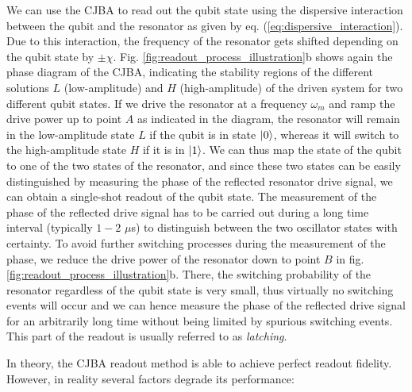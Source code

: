 We can use the CJBA to read out the qubit state using the dispersive interaction between the qubit and the resonator as given by eq. (\ref{eq:dispersive_interaction}). Due to this interaction, the frequency of the resonator gets shifted depending on the qubit state by $\pm\chi$. Fig. \ref{fig:readout_process_illustration}b shows again the phase diagram of the CJBA, indicating the stability regions of the different solutions $L$ (low-amplitude) and $H$ (high-amplitude) of the driven system for two different qubit states. If we drive the resonator at a frequency $\omega_m$ and ramp the drive power up to point $A$ as indicated in the diagram, the resonator will remain in the low-amplitude state $L$ if the qubit is in state $\left| 0 \right>$, whereas it will switch to the high-amplitude state $H$ if it is in $\left| 1 \right>$. We can thus map the state of the qubit to one of the two states of the resonator, and since these two states can be easily distinguished by measuring the phase of the reflected resonator drive signal, we can obtain a single-shot readout of the qubit state. The measurement of the phase of the reflected drive signal has to be carried out during a long time interval (typically $1-2$ $\mu$s) to distinguish between the two oscillator states with certainty. To avoid further switching processes during the measurement of the phase, we reduce the drive power of the resonator down to point $B$ in fig. \ref{fig:readout_process_illustration}b. There, the switching probability of the resonator regardless of the qubit state is very small, thus virtually no switching events will occur and we can hence measure the phase of the reflected drive signal for an arbitrarily long time without being limited by spurious switching events. This part of the readout is usually referred to as {\it latching}. 

\smallskip

In theory, the CJBA readout method is able to achieve perfect readout fidelity. However, in reality several factors degrade its performance:

